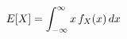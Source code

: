 \documentclass[preview]{standalone}
\begin{document}
\begin{align*}
\special{dvisvgm:raw <g id='unique000'>}E[X]=\int_{-\infty}^{\infty} x\,f_X(x)\,dx\special{dvisvgm:raw </g>}
\end{align*}
\end{document}
